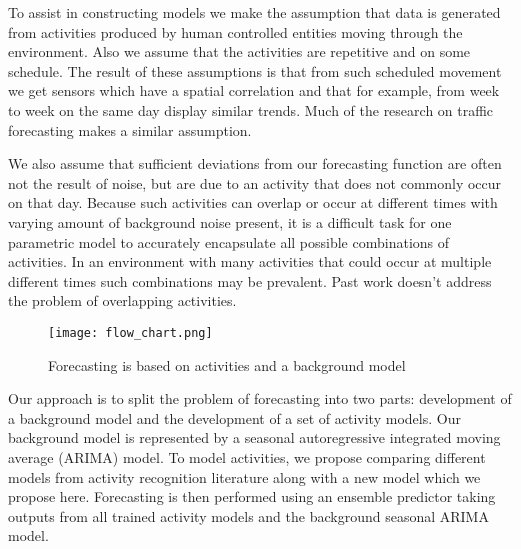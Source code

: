 To assist in constructing models we make the assumption that data is generated from activities produced by human controlled entities moving through the environment.  Also we assume that the activities are repetitive and on some schedule.  The result of these assumptions is that from such scheduled movement we get sensors which have a spatial correlation and that for example, from week to week on the same day display similar trends.   Much of the research on traffic forecasting makes a similar assumption.  

We also assume that sufficient deviations from our forecasting function are often not the result of noise, but are due to an activity that does not commonly occur on that day.  Because such activities can overlap or occur at different times with varying amount of background noise present, it is a difficult task for one parametric model to accurately encapsulate all possible combinations of activities.  In an environment with many activities that could occur at multiple different times such combinations may be prevalent.  Past work doesn't address the problem of overlapping activities.  


\begin{wrapfigure}{r}{5cm}
\begin{center}
\texttt{[image: flow\_chart.png]}
\end{center}
\caption{Forecasting is based on activities and a background model}
\label{fig:flow_chart}
\end{wrapfigure}

Our approach is to split the problem of forecasting into two parts: development of a background model and the development of a set of activity models.  Our background model is represented by a seasonal autoregressive integrated moving average (ARIMA) model.  To model activities, we propose comparing different models from activity recognition literature along with a new model which we propose here.  Forecasting is then performed using an ensemble predictor taking outputs from all trained activity models and the background seasonal ARIMA model.



